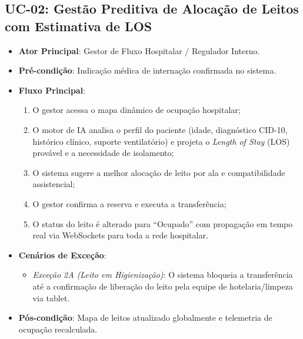 \documentclass[12pt,oneside,a4paper,article]{abntex2}
\begin{document}
\subsection{UC-02: Gestão Preditiva de Alocação de Leitos com Estimativa de LOS}
\begin{itemize}[noitemsep]
  \item \textbf{Ator Principal}: Gestor de Fluxo Hospitalar / Regulador Interno.
  \item \textbf{Pré-condição}: Indicação médica de internação confirmada no sistema.
  \item \textbf{Fluxo Principal}:
  \begin{enumerate}[noitemsep]
    \item O gestor acessa o mapa dinâmico de ocupação hospitalar;
    \item O motor de IA analisa o perfil do paciente (idade, diagnóstico CID-10, histórico clínico, suporte ventilatório) e projeta o \textit{Length of Stay} (LOS) provável e a necessidade de isolamento;
    \item O sistema sugere a melhor alocação de leito por ala e compatibilidade assistencial;
    \item O gestor confirma a reserva e executa a transferência;
    \item O status do leito é alterado para ``Ocupado'' com propagação em tempo real via WebSockets para toda a rede hospitalar.
  \end{enumerate}
  \item \textbf{Cenários de Exceção}:
  \begin{itemize}[noitemsep]
    \item \textit{Exceção 2A (Leito em Higienização)}: O sistema bloqueia a transferência até a confirmação de liberação do leito pela equipe de hotelaria/limpeza via tablet.
  \end{itemize}
  \item \textbf{Pós-condição}: Mapa de leitos atualizado globalmente e telemetria de ocupação recalculada.
\end{itemize}
\end{document}
